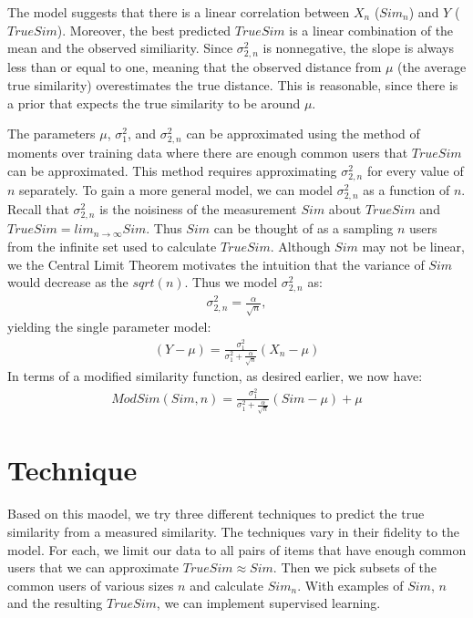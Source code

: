 \documentclass[11pt]{article}
\begin{document}
The model suggests that there is a linear correlation between $X_n$ ($Sim_n$)
and $Y$ ($TrueSim$). Moreover, the best predicted $TrueSim$ is a linear 
combination of the mean and the observed similiarity. Since $\sigma_{2,n}^2$ is 
nonnegative, the slope is always less than or equal to one, meaning that the 
observed distance from $\mu$ (the average true similarity) overestimates the 
true distance. This is reasonable, since there is a prior that expects the true 
similarity to be around $\mu$.

The parameters $\mu$, $\sigma_{1}^2$, and $\sigma_{2,n}^2$ can be approximated 
using the method of moments over training data where there are enough common
users that $TrueSim$ can be approximated. This method requires approximating
$\sigma_{2,n}^2$ for every value of $n$ separately. To gain a more general 
model, we can model $\sigma_{2,n}^2$ as a function of $n$. Recall that 
$\sigma_{2,n}^2$ is the noisiness of the measurement $Sim$ about $TrueSim$ and $TrueSim = lim_{n \to
\infty}Sim$. Thus $Sim$ can be thought of as a sampling $n$ users from the
infinite set used to calculate $TrueSim$. Although $Sim$ may not be linear, we
the Central Limit Theorem motivates the intuition that the variance of $Sim$
would decrease as the $sqrt(n)$. Thus we model $\sigma_{2,n}^2$ as:
\begin{align}
\sigma_{2,n}^2 = \frac{\alpha}{\sqrt{n}},
\end{align}
yielding the single parameter model:
\begin{align}
\left(Y - \mu\right) = \frac{\sigma_{1}^2}{\sigma_{1}^2+\frac{\alpha}{\sqrt{n}}}
\left(X_n-\mu\right)
\end{align}
In terms of a modified similarity function, as desired earlier, we now have:
\begin{align}
ModSim(Sim, n) = \frac{\sigma_{1}^2}{\sigma_{1}^2+\frac{\alpha}{\sqrt{n}}}
\left(Sim-\mu\right) + \mu
\end{align}

\section*{Technique}
Based on this maodel, we try three different techniques to predict the true similarity from a
measured similarity. The techniques vary in their fidelity to the model. For
each, we limit our data to all pairs of items that have enough common users that
we can approximate $TrueSim \approx Sim$. Then we pick subsets of the common
users of various sizes $n$ and calculate $Sim_{n}$. With examples of $Sim$, $n$
and the resulting $TrueSim$, we can implement supervised learning.
\end{document}
